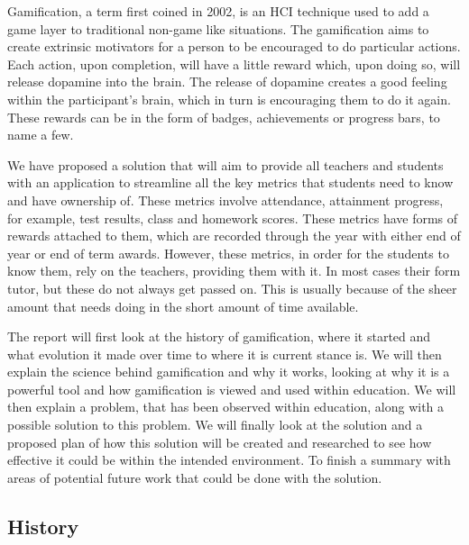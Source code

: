 \documentclass[sigchi]{acmart}
\begin{document}
Gamification, a term first coined in 2002, is an HCI technique used to add a game layer to traditional non-game like situations. The gamification aims to create extrinsic motivators for a person to be encouraged to do particular actions. Each action, upon completion, will have a little reward which, upon doing so, will release dopamine into the brain. The release of dopamine creates a good feeling within the participant's brain, which in turn is encouraging them to do it again. These rewards can be in the form of badges, achievements or progress bars, to name a few.

We have proposed a solution that will aim to provide all teachers and students with an application to streamline all the key metrics that students need to know and have ownership of. These metrics involve attendance, attainment progress, for example, test results, class and homework scores. These metrics have forms of rewards attached to them, which are recorded through the year with either end of year or end of term awards. However, these metrics, in order for the students to know them, rely on the teachers, providing them with it. In most cases their form tutor, but these do not always get passed on. This is usually because of the sheer amount that needs doing in the short amount of time available. 


The report will first look at the history of gamification, where it started and what evolution it made over time to where it is current stance is. We will then explain the science behind gamification and why it works, looking at why it is a powerful tool and how gamification is viewed and used within education. We will then explain a problem, that has been observed within education, along with a possible solution to this problem. We will finally look at the solution and a proposed plan of how this solution will be created and researched to see how effective it could be within the intended environment. To finish a summary with areas of potential future work that could be done with the solution.

\subsection{History}
\end{document}
